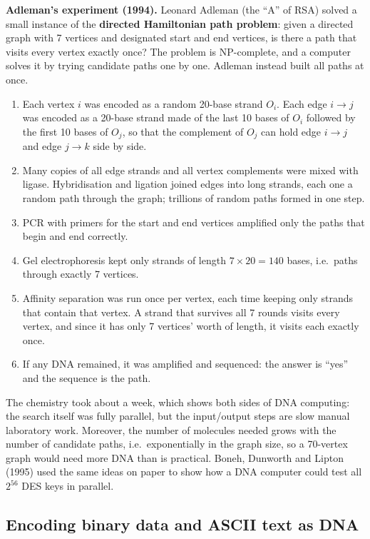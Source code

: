 \textbf{Adleman's experiment (1994).} Leonard Adleman (the ``A'' of RSA) solved a small instance of the \textbf{directed Hamiltonian path problem}: given a directed graph with 7 vertices and designated start and end vertices, is there a path that visits every vertex exactly once? The problem is NP-complete, and a computer solves it by trying candidate paths one by one. Adleman instead built all paths at once.
\begin{enumerate}
  \item Each vertex $i$ was encoded as a random 20-base strand $O_i$. Each edge $i \to j$ was encoded as a 20-base strand made of the last 10 bases of $O_i$ followed by the first 10 bases of $O_j$, so that the complement of $O_j$ can hold edge $i \to j$ and edge $j \to k$ side by side.
  \item Many copies of all edge strands and all vertex complements were mixed with ligase. Hybridisation and ligation joined edges into long strands, each one a random path through the graph; trillions of random paths formed in one step.
  \item PCR with primers for the start and end vertices amplified only the paths that begin and end correctly.
  \item Gel electrophoresis kept only strands of length $7 \times 20 = 140$ bases, i.e.\ paths through exactly 7 vertices.
  \item Affinity separation was run once per vertex, each time keeping only strands that contain that vertex. A strand that survives all 7 rounds visits every vertex, and since it has only 7 vertices' worth of length, it visits each exactly once.
  \item If any DNA remained, it was amplified and sequenced: the answer is ``yes'' and the sequence is the path.
\end{enumerate}
The chemistry took about a week, which shows both sides of DNA computing: the search itself was fully parallel, but the input/output steps are slow manual laboratory work. Moreover, the number of molecules needed grows with the number of candidate paths, i.e.\ exponentially in the graph size, so a 70-vertex graph would need more DNA than is practical. Boneh, Dunworth and Lipton (1995) used the same ideas on paper to show how a DNA computer could test all $2^{56}$ DES keys in parallel.

\subsection{Encoding binary data and ASCII text as DNA \hot\new}

